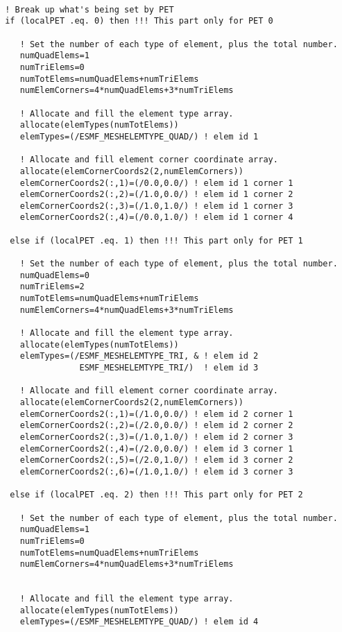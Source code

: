  \begin{verbatim}

 ! Break up what's being set by PET
 if (localPET .eq. 0) then !!! This part only for PET 0

    ! Set the number of each type of element, plus the total number.
    numQuadElems=1
    numTriElems=0
    numTotElems=numQuadElems+numTriElems
    numElemCorners=4*numQuadElems+3*numTriElems

    ! Allocate and fill the element type array.
    allocate(elemTypes(numTotElems))
    elemTypes=(/ESMF_MESHELEMTYPE_QUAD/) ! elem id 1

    ! Allocate and fill element corner coordinate array.
    allocate(elemCornerCoords2(2,numElemCorners))
    elemCornerCoords2(:,1)=(/0.0,0.0/) ! elem id 1 corner 1 
    elemCornerCoords2(:,2)=(/1.0,0.0/) ! elem id 1 corner 2
    elemCornerCoords2(:,3)=(/1.0,1.0/) ! elem id 1 corner 3
    elemCornerCoords2(:,4)=(/0.0,1.0/) ! elem id 1 corner 4

  else if (localPET .eq. 1) then !!! This part only for PET 1

    ! Set the number of each type of element, plus the total number.
    numQuadElems=0
    numTriElems=2
    numTotElems=numQuadElems+numTriElems
    numElemCorners=4*numQuadElems+3*numTriElems

    ! Allocate and fill the element type array.
    allocate(elemTypes(numTotElems))
    elemTypes=(/ESMF_MESHELEMTYPE_TRI, & ! elem id 2
                ESMF_MESHELEMTYPE_TRI/)  ! elem id 3

    ! Allocate and fill element corner coordinate array.
    allocate(elemCornerCoords2(2,numElemCorners))
    elemCornerCoords2(:,1)=(/1.0,0.0/) ! elem id 2 corner 1 
    elemCornerCoords2(:,2)=(/2.0,0.0/) ! elem id 2 corner 2
    elemCornerCoords2(:,3)=(/1.0,1.0/) ! elem id 2 corner 3
    elemCornerCoords2(:,4)=(/2.0,0.0/) ! elem id 3 corner 1 
    elemCornerCoords2(:,5)=(/2.0,1.0/) ! elem id 3 corner 2
    elemCornerCoords2(:,6)=(/1.0,1.0/) ! elem id 3 corner 3

  else if (localPET .eq. 2) then !!! This part only for PET 2

    ! Set the number of each type of element, plus the total number.
    numQuadElems=1
    numTriElems=0
    numTotElems=numQuadElems+numTriElems
    numElemCorners=4*numQuadElems+3*numTriElems


    ! Allocate and fill the element type array.
    allocate(elemTypes(numTotElems))
    elemTypes=(/ESMF_MESHELEMTYPE_QUAD/) ! elem id 4


\end{verbatim}
